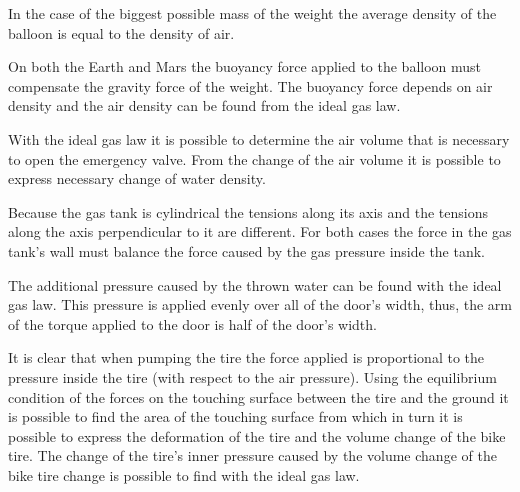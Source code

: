\documentclass[11pt]{article}
\begin{document}

\hinteng
In the case of the biggest possible mass of the weight the average density of the balloon is equal to the density of air.
\probend
\bigskip


\hinteng
On both the Earth and Mars the buoyancy force applied to the balloon must compensate the gravity force of the weight. The buoyancy force depends on air density and the air density can be found from the ideal gas law.
\probend
\bigskip


\hinteng
With the ideal gas law it is possible to determine the air volume that is necessary to open the emergency valve. From the change of the air volume it is possible to express necessary change of water density.
\probend
\bigskip


\hinteng
Because the gas tank is cylindrical the tensions along its axis and the tensions along the axis perpendicular to it are different. For both cases the force in the gas tank’s wall must balance the force caused by the gas pressure inside the tank.
\probend
\bigskip


\hinteng
The additional pressure caused by the thrown water can be found with the ideal gas law. This pressure is applied evenly over all of the door's width, thus, the arm of the torque applied to the door is half of the door's width.
\probend
\bigskip


\hinteng
It is clear that when pumping the tire the force applied is proportional to the pressure inside the tire (with respect to the air pressure). Using the equilibrium condition of the forces on the touching surface between the tire and the ground it is possible to find the area of the touching surface from which in turn it is possible to express the deformation of the tire and the volume change of the bike tire. The change of the tire's inner pressure caused by the volume change of the bike tire change is possible to find with the ideal gas law.
\probend
\bigskip
\end{document}
